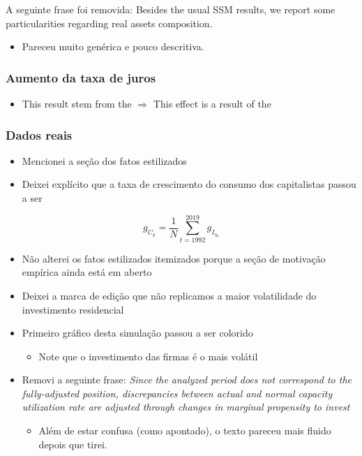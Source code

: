 \documentclass[11pt]{article}
\begin{document}
A seguinte frase foi removida: Besides the usual SSM results, we report some particularities regarding real assets composition.

\begin{itemize}
\item Pareceu muito genérica e pouco descritiva.
\end{itemize}


\subsubsection*{Aumento da taxa de juros}
\label{sec:orgf59f8ae}
\begin{itemize}
\item This result stem from the \(\Rightarrow\) This effect is a result of the
\end{itemize}

\subsubsection*{Dados reais}
\label{sec:org2e8007e}

\begin{itemize}
\item Mencionei a seção dos fatos estilizados
\item Deixei explícito que a taxa de crescimento do consumo dos capitalistas passou a ser
\end{itemize}

\begin{equation}
  \label{gck_real}
  g_{C_k} = \frac{1}{N} \sum_{t=1992}^{2019} g_{I_{h_{t}}}
\end{equation}

\begin{itemize}
\item Não alterei os fatos estilizados itemizados porque a seção de motivação empírica ainda está em aberto
\item Deixei a marca de edição que não replicamos a maior volatilidade do investimento residencial
\item Primeiro gráfico desta simulação passou a ser colorido
\begin{itemize}
\item Note que o investimento das firmas é o mais volátil
\end{itemize}
\item Removi a seguinte frase: \emph{Since the analyzed period does not correspond to the fully-adjusted position, discrepancies between actual and normal capacity utilization rate are adjusted through changes in marginal propensity to invest}
\begin{itemize}
\item Além de estar confusa (como apontado), o texto pareceu mais fluido depois que tirei.
\end{itemize}
\end{itemize}
\end{document}
